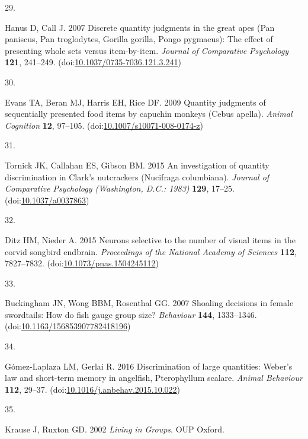 \documentclass[
  ,doc,floatsintext]{apa6}
\newlength{\cslhangindent}
\newlength{\csllabelwidth}
\newlength{\cslentryspacingunit} %
\newenvironment{CSLReferences}[2] %
 {%
  \setlength{\parindent}{0pt}
  \ifodd #1
  \let\oldpar\par
  \def\par{\hangindent=\cslhangindent\oldpar}
  \fi
  \setlength{\parskip}{#2\cslentryspacingunit}
 }%
 {}
\newcommand{\CSLLeftMargin}[1]{\parbox[t]{\csllabelwidth}{#1}}
\newcommand{\CSLRightInline}[1]{\parbox[t]{\linewidth - \csllabelwidth}{#1}\break}
\begin{document}
\begin{CSLReferences}{0}{0}
\leavevmode{}%
\CSLLeftMargin{29. }%
\CSLRightInline{Hanus D, Call J. 2007 Discrete quantity judgments in the great apes ({Pan} paniscus, {Pan} troglodytes, {Gorilla} gorilla, {Pongo} pygmaeus): {The} effect of presenting whole sets versus item-by-item. \emph{Journal of Comparative Psychology} \textbf{121}, 241--249. (doi:\href{https://doi.org/10.1037/0735-7036.121.3.241}{10.1037/0735-7036.121.3.241})}

\leavevmode{}%
\CSLLeftMargin{30. }%
\CSLRightInline{Evans TA, Beran MJ, Harris EH, Rice DF. 2009 Quantity judgments of sequentially presented food items by capuchin monkeys ({Cebus} apella). \emph{Animal Cognition} \textbf{12}, 97--105. (doi:\href{https://doi.org/10.1007/s10071-008-0174-z}{10.1007/s10071-008-0174-z})}

\leavevmode{}%
\CSLLeftMargin{31. }%
\CSLRightInline{Tornick JK, Callahan ES, Gibson BM. 2015 An investigation of quantity discrimination in {Clark}'s nutcrackers ({Nucifraga} columbiana). \emph{Journal of Comparative Psychology (Washington, D.C.: 1983)} \textbf{129}, 17--25. (doi:\href{https://doi.org/10.1037/a0037863}{10.1037/a0037863})}

\leavevmode{}%
\CSLLeftMargin{32. }%
\CSLRightInline{Ditz HM, Nieder A. 2015 Neurons selective to the number of visual items in the corvid songbird endbrain. \emph{Proceedings of the National Academy of Sciences} \textbf{112}, 7827--7832. (doi:\href{https://doi.org/10.1073/pnas.1504245112}{10.1073/pnas.1504245112})}

\leavevmode{}%
\CSLLeftMargin{33. }%
\CSLRightInline{Buckingham JN, Wong BBM, Rosenthal GG. 2007 Shoaling decisions in female swordtails: {How} do fish gauge group size? \emph{Behaviour} \textbf{144}, 1333--1346. (doi:\href{https://doi.org/10.1163/156853907782418196}{10.1163/156853907782418196})}

\leavevmode{}%
\CSLLeftMargin{34. }%
\CSLRightInline{Gómez-Laplaza LM, Gerlai R. 2016 Discrimination of large quantities: {Weber}'s law and short-term memory in angelfish, {Pterophyllum} scalare. \emph{Animal Behaviour} \textbf{112}, 29--37. (doi:\href{https://doi.org/10.1016/j.anbehav.2015.10.022}{10.1016/j.anbehav.2015.10.022})}

\leavevmode{}%
\CSLLeftMargin{35. }%
\CSLRightInline{Krause J, Ruxton GD. 2002 \emph{Living in {Groups}}. OUP Oxford. }


\end{CSLReferences}
\end{document}
